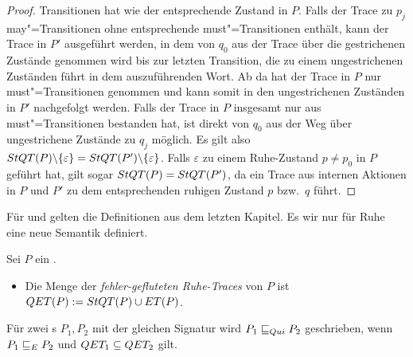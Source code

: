 \begin{proof}
  Transitionen hat wie der entsprechende Zustand in $P$. Falls der Trace zu
  $p_j$ may"=Transitionen ohne entsprechende must"=Transitionen enthält, kann
  der Trace in $P'$ ausgeführt werden, in dem von $q_0$ aus der Trace über die
  gestrichenen Zustände genommen wird bis zur letzten Transition, die zu einem
  ungestrichenen Zuständen führt in dem auszuführenden Wort. Ab da hat der
  Trace in $P$ nur must"=Transitionen genommen und kann somit in den
  ungestrichenen Zuständen in $P'$ nachgefolgt werden. Falls der Trace in $P$
  insgesamt nur aus must"=Transitionen bestanden hat, ist direkt von $q_0$ aus
  der Weg über ungestrichene Zustände zu $q_j$ möglich. Es gilt also $StQT
  (P)\backslash \{\varepsilon\} = StQT (P')\backslash \{\varepsilon\}$. Falls
  $\varepsilon$ zu einem Ruhe-Zustand $p \neq p_0$ in $P$ geführt hat, gilt
  sogar $StQT(P) = StQT (P')$, da ein Trace aus internen Aktionen in $P$ und
  $P'$ zu dem entsprechenden ruhigen Zustand $p$ bzw.\ $q$ führt.
\end{proof}

Für \ET{} und \EL{} gelten die Definitionen aus dem letzten Kapitel. Es wir nur
für Ruhe eine neue Semantik definiert.

\begin{Def}
  \label{RuheSemDef}
  Sei $P$ ein \MEIO{}.
  \begin{itemize}
    \item Die Menge der \emph{fehler-gefluteten Ruhe-Traces} von $P$ ist $QET
      (P):= StQT (P)\cup ET (P)$.
  \end{itemize}
  Für zwei \MEIO{}s $P_1,P_2$ mit der gleichen Signatur wird $P_1 \sqsubseteq  _{Qui}{} P_2$
  geschrieben, wenn $P_1 \sqsubseteq  _E{} P_2$ und $QET _1\subseteq QET _2$ gilt.
\end{Def}

\vspace{0.2cm}

